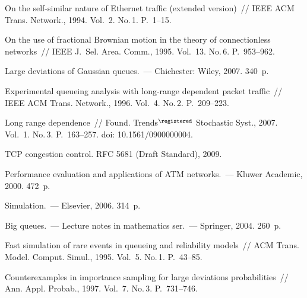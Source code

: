 


 \begin{multicols}{2}

\renewcommand{\bibname}{\protect\rmfamily Литература}

{\small\frenchspacing
{%
\begin{thebibliography}{99}

On the self-similar nature of Ethernet traffic (extended version)~// IEEE ACM Trans. 
Network., 1994. Vol.~2. No.\,1. P.~1--15.



 On the use of fractional Brownian motion in the theory of
  connectionless networks~// IEEE J.~Sel. Area. Comm.,  1995. Vol.~13. 
  No.\,6. P.~953--962.
  
 Large deviations of Gaussian queues.~---
Chichester: Wiley, 2007. 340~p.

 Experimental queueing analysis with 
long-range dependent packet traffic~//  IEEE ACM Trans. Network., 1996. Vol.~4. No.\,2. 
P.~209--223.

 Long range dependence~// 
 Found. Trends$^\registered$ Stochastic Syst., 2007. Vol.~1. No.\,3. P.~163--257. 
 doi: 10.1561/0900000004.

 TCP congestion control. RFC 5681
(Draft Standard), 2009.

 Performance evaluation and applications of ATM networks.~--- 
Kluwer Academic, 2000. 472~p.

 Simulation.~--- Elsevier, 2006. 314~p.

 Big queues.~--- 
Lecture notes in mathematics ser.~--- Springer, 2004. 260~p.

 Fast simulation of rare events in queueing and reliability models~// 
 ACM Trans. Model. Comput. Simul., 1995. Vol.~5. No.\,1. P.~43--85.

 Counterexamples in importance sampling for large 
deviations probabilities~//  Ann. Appl. Probab., 1997. Vol.~7. No.\,3. P.~731--746.


\end{thebibliography}}}
\end{multicols}
